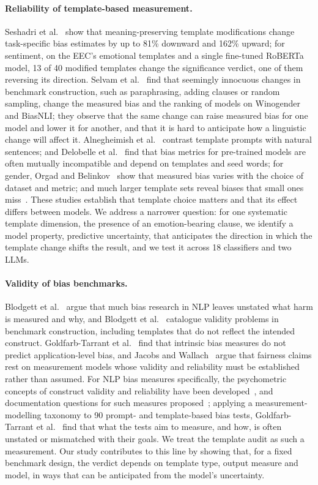 \documentclass[runningheads]{llncs}
\begin{document}
\paragraph{Reliability of template-based measurement.}
Seshadri et al.~\cite{seshadri2022} show that meaning-preserving template
modifications change task-specific bias estimates by up to 81\% downward and
162\% upward; for sentiment, on the EEC's emotional templates and a single
fine-tuned RoBERTa model, 13 of 40 modified templates change the significance
verdict, one of them reversing its direction. Selvam et al.~\cite{selvam2023}
find that seemingly innocuous changes in benchmark construction, such as
paraphrasing, adding clauses or random sampling, change the measured bias and
the ranking of models on Winogender and BiasNLI; they observe that the same
change can raise measured bias for one model and lower it for another, and that
it is hard to anticipate how a linguistic change will affect it. Alnegheimish et al.~\cite{alnegheimish2022}
contrast template prompts with natural sentences; and Delobelle et
al.~\cite{delobelle2022} find that bias metrics for pre-trained models are often
mutually incompatible and depend on templates and seed words; for gender, Orgad
and Belinkov~\cite{orgad2022} show that measured bias varies with the choice of
dataset and metric; and much larger template sets reveal biases that small ones
miss~\cite{smith2022}. These studies establish that template choice matters and
that its effect differs between models. We address a narrower question: for
one systematic template dimension, the presence of an emotion-bearing clause,
we identify a model property, predictive uncertainty, that anticipates the
direction in which the template change shifts the result, and we test it
across 18 classifiers and two LLMs.

\paragraph{Validity of bias benchmarks.}
Blodgett et al.~\cite{blodgett2020} argue that much bias research in NLP leaves
unstated what harm is measured and why, and Blodgett et al.~\cite{blodgett2021}
catalogue validity problems in benchmark construction, including templates that
do not reflect the intended construct. Goldfarb-Tarrant et
al.~\cite{goldfarb2021} find that intrinsic bias measures do not predict
application-level bias, and Jacobs and Wallach~\cite{jacobs2021} argue that
fairness claims rest on measurement models whose validity and reliability must
be established rather than assumed. For NLP bias measures specifically, the
psychometric concepts of construct validity and reliability have been
developed~\cite{vanderwal2024}, and documentation questions for such measures
proposed~\cite{dev2022}; applying a measurement-modelling taxonomy to 90
prompt- and template-based bias tests, Goldfarb-Tarrant et al.~\cite{goldfarb2023}
find that what the tests aim to measure, and how, is often unstated or
mismatched with their goals. We treat the template audit
as such a measurement. Our study contributes to this line by showing that, for
a fixed benchmark design, the verdict depends on template type, output measure
and model, in ways that can be anticipated from the model's uncertainty.
\end{document}
